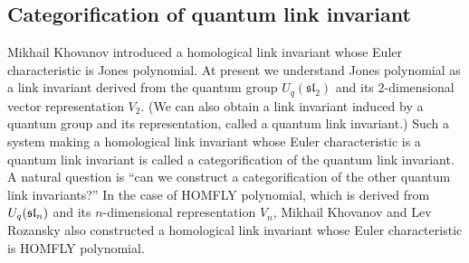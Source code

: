 \documentclass[10pt]{amsart}
\theoremstyle{break}
\begin{document}
\subsection{Categorification of quantum link invariant}\label{1-cat}
Mikhail Khovanov introduced a homological link invariant whose Euler characteristic is Jones polynomial. At present we understand Jones polynomial as a link invariant derived from the quantum group $U_q(\mathfrak{sl}_2)$ and its $2$-dimensional vector representation $V_2$. (We can also obtain a link invariant induced by a quantum group and its representation, called a quantum link invariant.)
Such a system making a homological link invariant whose Euler characteristic is a quantum link invariant is called a categorification of the quantum link invariant.
A natural question is ``can we construct a categorification of the other quantum link invariants?''
In the case of HOMFLY polynomial, which is derived from $U_q(\frak{sl}_n)$ and its $n$-dimensional representation $V_n$, Mikhail Khovanov and Lev Rozansky also constructed a homological link invariant whose Euler characteristic is HOMFLY polynomial.
\end{document}

